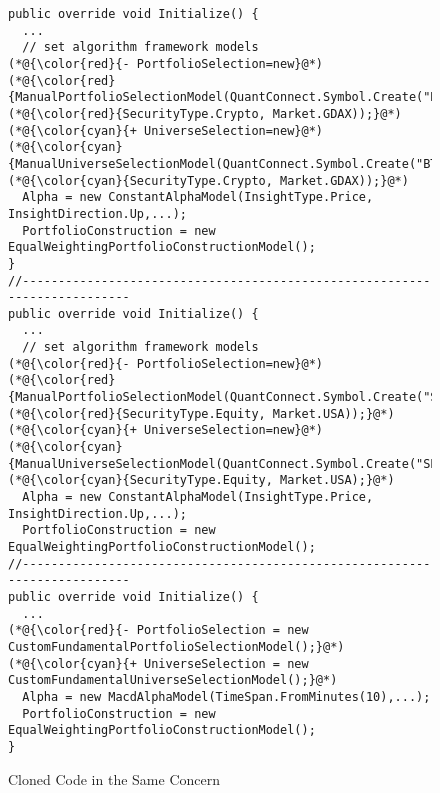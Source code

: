 \begin{figure}[t]
	\centering
	\begin{lstlisting}[]
public override void Initialize() {
  ...
  // set algorithm framework models
(*@{\color{red}{- PortfolioSelection=new}@*) (*@{\color{red}{ManualPortfolioSelectionModel(QuantConnect.Symbol.Create("BTCUSD",}@*) (*@{\color{red}{SecurityType.Crypto, Market.GDAX));}@*)   
(*@{\color{cyan}{+ UniverseSelection=new}@*) (*@{\color{cyan}{ManualUniverseSelectionModel(QuantConnect.Symbol.Create("BTCUSD",}@*) (*@{\color{cyan}{SecurityType.Crypto, Market.GDAX));}@*)
  Alpha = new ConstantAlphaModel(InsightType.Price, InsightDirection.Up,...);
  PortfolioConstruction = new EqualWeightingPortfolioConstructionModel();
}
//--------------------------------------------------------------------------
public override void Initialize() {
  ...
  // set algorithm framework models
(*@{\color{red}{- PortfolioSelection=new}@*) (*@{\color{red}{ManualPortfolioSelectionModel(QuantConnect.Symbol.Create("SPY",}@*) (*@{\color{red}{SecurityType.Equity, Market.USA));}@*)   
(*@{\color{cyan}{+ UniverseSelection=new}@*) (*@{\color{cyan}{ManualUniverseSelectionModel(QuantConnect.Symbol.Create("SPY",}@*) (*@{\color{cyan}{SecurityType.Equity, Market.USA);}@*)
  Alpha = new ConstantAlphaModel(InsightType.Price, InsightDirection.Up,...);
  PortfolioConstruction = new EqualWeightingPortfolioConstructionModel();
//--------------------------------------------------------------------------
public override void Initialize() {
  ...
(*@{\color{red}{- PortfolioSelection = new CustomFundamentalPortfolioSelectionModel();}@*)
(*@{\color{cyan}{+ UniverseSelection = new CustomFundamentalUniverseSelectionModel();}@*)
  Alpha = new MacdAlphaModel(TimeSpan.FromMinutes(10),...);
  PortfolioConstruction = new EqualWeightingPortfolioConstructionModel();
}
	\end{lstlisting}
        \vspace{-15pt}
        \caption{Cloned Code in the Same Concern}
        \vspace{-6pt}
        \label{fig:motiv-clone}
\end{figure}

